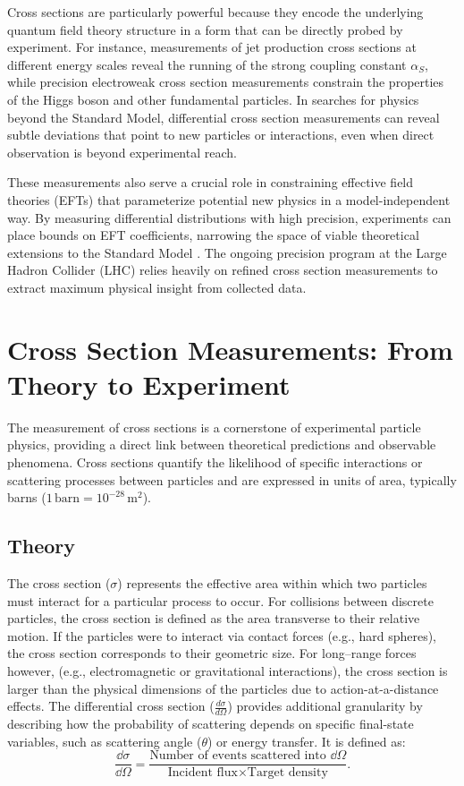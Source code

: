 Cross sections are particularly powerful because they encode the underlying quantum field theory structure in a form that can be directly probed by experiment.
%
For instance, measurements of jet production cross sections at different energy scales reveal the running of the strong coupling constant \(\alpha_S\), while precision electroweak cross section measurements constrain the properties of the Higgs boson and other fundamental particles.
%
In searches for physics beyond the Standard Model, differential cross section measurements can reveal subtle deviations that point to new particles or interactions, even when direct observation is beyond experimental reach.

These measurements also serve a crucial role in constraining effective field theories (EFTs) that parameterize potential new physics in a model-independent way.
%
By measuring differential distributions with high precision, experiments can place bounds on EFT coefficients, narrowing the space of viable theoretical extensions to the Standard Model .
%
The ongoing precision program at the Large Hadron Collider (LHC) relies heavily on refined cross section measurements to extract maximum physical insight from collected data.

\section{Cross Section Measurements: From Theory to Experiment}

The measurement of cross sections is a cornerstone of experimental particle physics, providing a direct link between theoretical predictions and observable phenomena. Cross sections quantify the likelihood of specific interactions or scattering processes between particles and are expressed in units of area, typically barns (\(1 \, \text{barn} = 10^{-28} \, \text{m}^2\)).

\subsection{Theory}

The cross section (\(\sigma\)) represents the effective area within which two particles must interact for a particular process to occur.
%
For collisions between discrete particles, the cross section is defined as the area transverse to their relative motion.
%
If the particles were to interact via contact forces (e.g., hard spheres), the cross section corresponds to their geometric size.
%
For long--range forces however, (e.g., electromagnetic or gravitational interactions), the cross section is larger than the physical dimensions of the particles due to action-at-a-distance effects.
%
The differential cross section (\(\frac{d\sigma}{d\Omega}\)) provides additional granularity by describing how the probability of scattering depends on specific final-state variables, such as scattering angle (\(\theta\)) or energy transfer. It is defined as:
\begin{equation}
    \frac{\dd\sigma}{\dd\Omega} = \frac{\text{Number of events scattered into } \dd\Omega}{\text{Incident flux} \times \text{Target density}}.
\end{equation}

